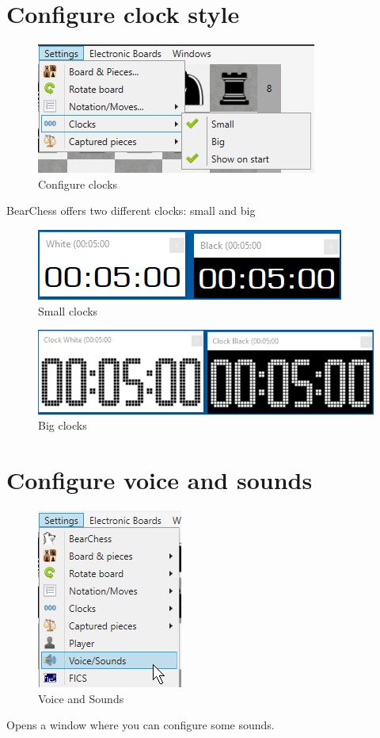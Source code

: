 \documentclass[11pt,a4paper]{article}
\begin{document}
	\section{Configure clock style}
	\begin{figure}[H]
		\centering
		\includegraphics[scale=1.0]{ConfigureClocks.png}
		\caption{Configure clocks }
		\label{fig:ConfigureClocks}
	\end{figure}
	
	BearChess offers two different clocks: small and big
	
	\begin{figure}[H]
		\centering
		\includegraphics[scale=1.0]{SmallClocks.png}
		\caption{Small clocks }
		\label{fig:SmallClocks}
	\end{figure}
	\begin{figure}[H]
		\centering
		\includegraphics[scale=0.8]{BigClocks.png}
		\caption{Big clocks }
		\label{fig:BigClocks}
	\end{figure}
	
	\section{Configure voice and sounds}
	
	\begin{figure}[H]
		\centering
		\includegraphics[scale=1.0]{Sounds2.png}
		\caption{Voice and Sounds}
		\label{fig:Sounds2}
	\end{figure}
	Opens a window where you can configure some sounds.
	
\end{document}
